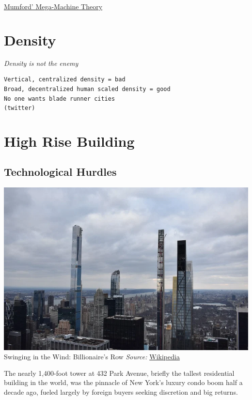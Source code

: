 \documentclass[
]{book}
\begin{document}
\href{https://capitalaspower.com/casp-forum/topic/questions-regarding-mumfords-theory-of-the-mega-machine/\#post-245381}{Mumford' Mega-Machine Theory}

\hypertarget{density}{%
\chapter{Density}\label{density}}

\emph{Density is not the enemy}

\begin{verbatim}
Vertical, centralized density = bad
Broad, decentralized human scaled density = good
No one wants blade runner cities
(twitter)
\end{verbatim}

\hypertarget{high-rise-building}{%
\chapter{High Rise Building}\label{high-rise-building}}

\hypertarget{technological-hurdles}{%
\section{Technological Hurdles}\label{technological-hurdles}}

\includegraphics{fig/billionaires_row_2020.png}
Swinging in the Wind: Billionaire's Row \emph{Source:} \href{https://commons.wikimedia.org/wiki/File:Billionaires\%27_Row_2020.jpg}{Wikipedia}

The nearly 1,400-foot tower at 432 Park Avenue, briefly the tallest residential building in the world, was the pinnacle of New York's luxury condo boom half a decade ago, fueled largely by foreign buyers seeking discretion and big returns.
\end{document}

